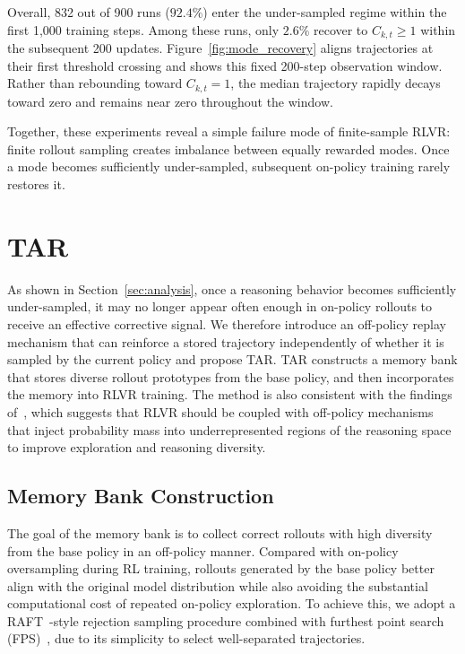 \documentclass[11pt]{article}
\newcommand{\model}{\textsc{TAR}\xspace}
\begin{document}
Overall, 832 out of 900 runs ($92.4\%$) enter the under-sampled regime within the first 1,000 training steps.
Among these runs, only $2.6\%$ recover to $C_{k,t}\geq 1$ within the subsequent 200 updates.
Figure~\ref{fig:mode_recovery} aligns trajectories at their first threshold crossing and shows this fixed 200-step observation window.
Rather than rebounding toward $C_{k,t}=1$, the median trajectory rapidly decays toward zero and remains near zero throughout the window.

Together, these experiments reveal a simple failure mode of finite-sample RLVR:
finite rollout sampling creates imbalance between equally rewarded modes. Once a mode becomes sufficiently under-sampled, subsequent on-policy training rarely restores it.

\section{\model}

As shown in Section~\ref{sec:analysis}, once a reasoning behavior becomes sufficiently under-sampled, it may no longer appear often enough in on-policy rollouts to receive an effective corrective signal. We therefore introduce an off-policy replay mechanism that can reinforce a stored trajectory independently of whether it is sampled by the current policy and propose \model.
\model constructs a memory bank that stores diverse rollout prototypes from the base policy, and then incorporates the memory into RLVR training. The method is also consistent with the findings of~\cite{wu2025invisible}, which suggests that RLVR should be coupled with off-policy mechanisms that inject probability mass into underrepresented regions of the reasoning space to improve exploration and reasoning diversity.


\subsection{Memory Bank Construction}

The goal of the memory bank is to collect correct rollouts with high diversity from the base policy in an off-policy manner. Compared with on-policy oversampling during RL training, rollouts generated by the base policy better align with the original model distribution while also avoiding the substantial computational cost of repeated on-policy exploration. To achieve this, we adopt a RAFT~\cite{dong2023raft}-style rejection sampling procedure combined with furthest point search (FPS)~\cite{fps}, due to its simplicity to select well-separated trajectories.
\end{document}
